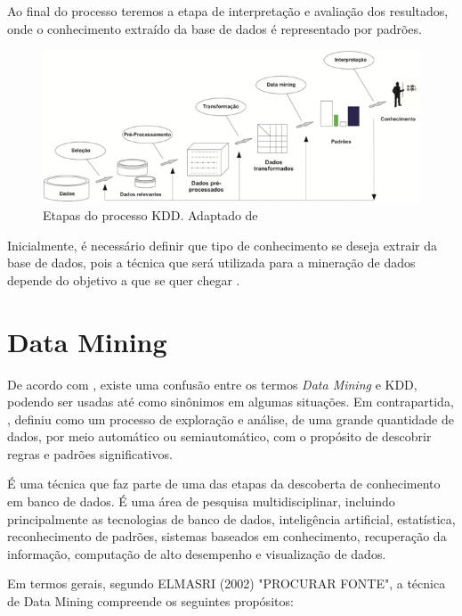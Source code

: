 \documentclass[
	12pt,				%
	openright,			%
	oneside,	
	a4paper,				%
	english,				%
	brazil				%
]{abntex2/abntex2} %
\begin{document}
	Ao final do processo teremos a etapa de interpretação e avaliação dos resultados, onde o conhecimento extraído da base de dados é representado por padrões.

		\begin{figure}[h!]
			\begin{center}
			    \includegraphics[scale=1]{img/dataMiningFayyad.png}
			\end{center}
			\caption{\label{figDataMiningFayyad} Etapas do processo KDD. Adaptado de \cite{fayyad:1996}}
		\end{figure}
		
		Inicialmente, é necessário definir que tipo de conhecimento se deseja extrair da base de dados, pois a técnica que será utilizada para a mineração de dados depende do objetivo a que se quer chegar \cite{damasceno:2005}.
		
	\section{Data Mining}
	
		De acordo com \cite{adriaans:1996}, existe uma confusão entre os termos \textit{Data Mining} e KDD, podendo ser usadas até como sinônimos em algumas situações. Em contrapartida, \cite{berry:1997}, definiu como um processo de exploração e análise, de uma grande quantidade  de dados, por meio automático ou semiautomático, com o propósito de descobrir regras e padrões significativos.
		
		É uma técnica que faz parte de uma das etapas da descoberta de conhecimento em banco de dados. É uma área de pesquisa multidisciplinar, incluindo principalmente as tecnologias de banco de dados, inteligência artificial, estatística, reconhecimento de padrões, sistemas baseados em conhecimento, recuperação da informação, computação de alto desempenho e visualização de dados.
		
		Em termos gerais, segundo ELMASRI (2002) "PROCURAR FONTE", a técnica de Data Mining compreende os seguintes propósitos:
		
\end{document}
